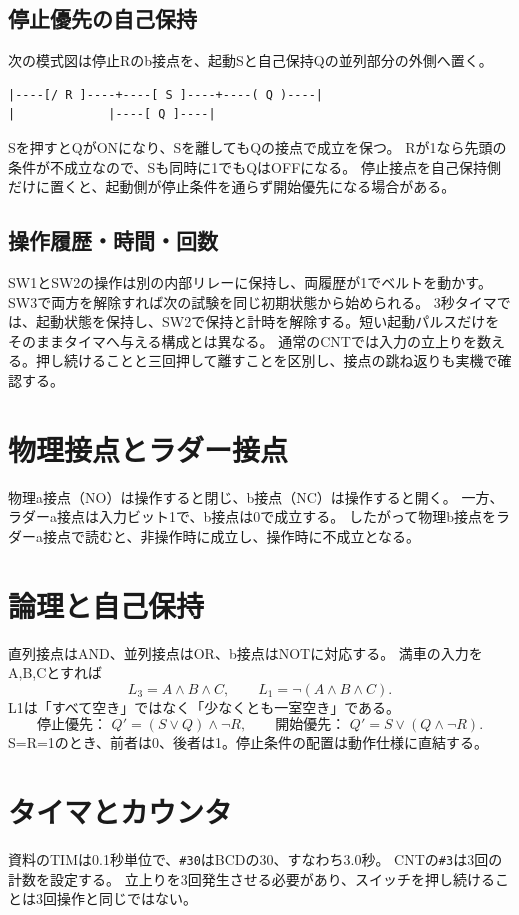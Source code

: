 \documentclass[lualatex,a4paper,10pt]{jlreq}
\begin{document}
\subsection{停止優先の自己保持}
次の模式図は停止Rのb接点を、起動Sと自己保持Qの並列部分の外側へ置く。
\begin{lstlisting}[numbers=none]
|----[/ R ]----+----[ S ]----+----( Q )----|
|             |----[ Q ]----|
\end{lstlisting}
Sを押すとQがONになり、Sを離してもQの接点で成立を保つ。
Rが1なら先頭の条件が不成立なので、Sも同時に1でもQはOFFになる。
停止接点を自己保持側だけに置くと、起動側が停止条件を通らず開始優先になる場合がある。
\subsection{操作履歴・時間・回数}
SW1とSW2の操作は別の内部リレーに保持し、両履歴が1でベルトを動かす。SW3で両方を解除すれば次の試験を同じ初期状態から始められる。
3秒タイマでは、起動状態を保持し、SW2で保持と計時を解除する。短い起動パルスだけをそのままタイマへ与える構成とは異なる。
通常のCNTでは入力の立上りを数える。押し続けることと三回押して離すことを区別し、接点の跳ね返りも実機で確認する。

\section{物理接点とラダー接点}\label{sec:auto3}
物理a接点（NO）は操作すると閉じ、b接点（NC）は操作すると開く。
一方、ラダーa接点は入力ビット1で、b接点は0で成立する。
したがって物理b接点をラダーa接点で読むと、非操作時に成立し、操作時に不成立となる。
\section{論理と自己保持}\label{sec:auto4}
直列接点はAND、並列接点はOR、b接点はNOTに対応する。
満車の入力をA,B,Cとすれば
\[
 L_3=A\land B\land C,\qquad L_1=\lnot(A\land B\land C).
\]
L1は「すべて空き」ではなく「少なくとも一室空き」である。
\[
 \text{停止優先： }Q'=(S\lor Q)\land\lnot R,\qquad
 \text{開始優先： }Q'=S\lor(Q\land\lnot R).
\]
S=R=1のとき、前者は0、後者は1。停止条件の配置は動作仕様に直結する。
\section{タイマとカウンタ}\label{sec:auto5}
資料のTIMは0.1秒単位で、\texttt{\#30}はBCDの30、すなわち3.0秒。
CNTの\texttt{\#3}は3回の計数を設定する。
立上りを3回発生させる必要があり、スイッチを押し続けることは3回操作と同じではない。
\clearpage
\end{document}
